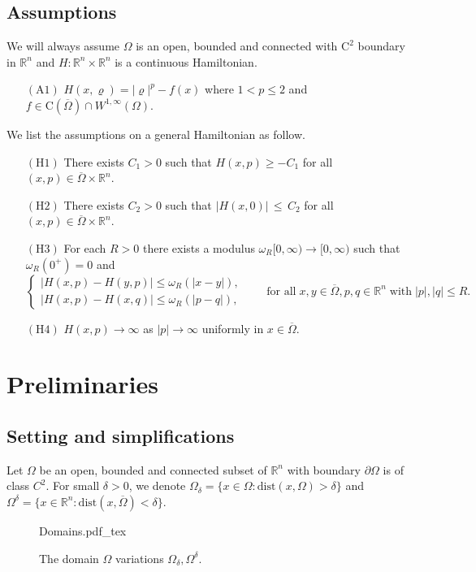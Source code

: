 \documentclass[11pt,reqno]{amsart}
\numberwithin{figure}{section}
\theoremstyle{plain}
\theoremstyle{remark}
\numberwithin{equation}{section}
\newcommand{\incfig}[1]{%
    \def\svgwidth{\columnwidth}
    {#1.pdf_tex}
}
\begin{document}
\subsection{Assumptions} We will always assume $\Omega$ is an open, bounded and connected with $\mathrm{C}^2$ boundary in $\mathbb{R}^n$ and $H:\mathbb{R}^n\times \mathbb{R}^n$ is a continuous Hamiltonian. 
\begin{itemize}
    \item[$\mathrm{(A1)}$] $H(x,\varrho) = |\varrho|^p - f(x)$ where $1<p\leq 2$ and $f\in \mathrm{C}(\overline{\Omega})\cap W^{1,\infty}(\Omega)$.
\end{itemize}
We list the assumptions on a general Hamiltonian as follow.
\begin{itemize}
    \item[$\mathrm{(H1)}$] There exists $C_1 > 0$ such that $H(x,p) \geq -C_1$ for all $(x,p)\in \overline{\Omega}\times\mathbb{R}^n$.
    \item[$\mathrm{(H2)}$] There exists $C_2>0$ such that $|H(x,0)|\,\leq \,C_2$ for all $(x,p)\in \overline{\Omega}\times \mathbb{R}^n$.
    \item[$\mathrm{(H3)}$] For each $R>0$ there exists a modulus $\omega_{R}[0,\infty)\to [0,\infty)$ such that $\omega_R(0^+) = 0$ and 
    \begin{equation*}
        \begin{cases}
        |H(x,p) - H(y,p)| \leq \omega_R(|x-y|),\\
        |H(x,p) - H(x,q)| \leq \omega_R(|p-q|),
        \end{cases} \qquad\text{for all}\;x,y\in \overline{\Omega}, p,q \in \mathbb{R}^n\;\text{with}\;|p|,|q|\leq R.
    \end{equation*}
    \item[$\mathrm{(H4)}$] $H(x,p)\rightarrow \infty$ as $|p|\to \infty$ uniformly in $x\in \overline{\Omega}$.
\end{itemize}

\section{Preliminaries}\label{sec:prelim} 
\subsection{Setting and simplifications} Let $\Omega$ be an open, bounded and connected subset of $\mathbb{R}^n$ with boundary $\partial\Omega$ is of class $C^2$. For small $\delta>0$, we denote $\Omega_\delta = \{x\in \Omega: \mathrm{dist}(x,\Omega) > \delta\}$ and $\Omega^\delta = \{x\in \mathbb{R}^n: \mathrm{dist}(x,\overline{\Omega}) < \delta\}$. 
\begin{figure}[ht]
    \centering
    \def\svgwidth{0.47\columnwidth}
    {Domains.pdf_tex}
    \caption{The domain $\Omega$ variations $\Omega_\delta, \Omega^\delta$.}
    \label{fig:Domains}
\end{figure}
\end{document}

